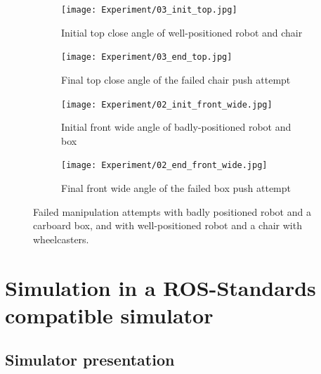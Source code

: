 \begin{figure}[H]

\begin{subfigure}{0.23\textwidth}
\texttt{[image: Experiment/03\_init\_top.jpg]}
\caption{Initial top close angle of well-positioned robot and chair} \label{fig:03_init_top}
\end{subfigure}\hspace*{\fill}
\begin{subfigure}{0.23\textwidth}
\texttt{[image: Experiment/03\_end\_top.jpg]}
\caption{Final top close angle of the failed chair push attempt} \label{fig:03_end_top}
\end{subfigure}\hspace*{\fill}
\begin{subfigure}{0.23\textwidth}
\texttt{[image: Experiment/02\_init\_front\_wide.jpg]}
\caption{Initial front wide angle of badly-positioned robot and box} \label{fig:02_init_front_wide}
\end{subfigure}\hspace*{\fill}
\begin{subfigure}{0.23\textwidth}
\texttt{[image: Experiment/02\_end\_front\_wide.jpg]}
\caption{Final front wide angle of the failed box push attempt} \label{fig:02_end_front_wide}
\end{subfigure}

\caption{Failed manipulation attempts with badly positioned robot and a carboard box, and with well-positioned robot and a chair with wheelcasters.} \label{fig:failed_attempts}
\end{figure}

\clearpage

\section{Simulation in a ROS-Standards compatible simulator}

\subsection{Simulator presentation}

